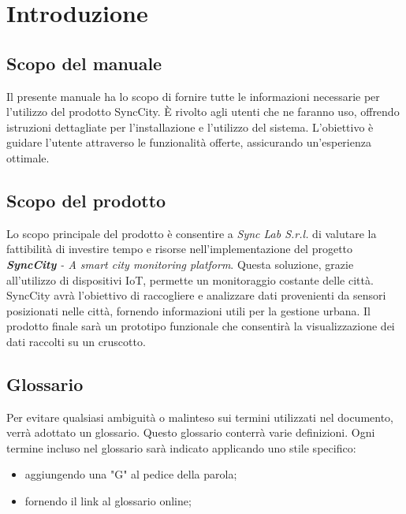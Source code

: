 \section{Introduzione}
\setcounter{subsection}{0}
\subsection{Scopo del manuale} %
Il presente manuale ha lo scopo di fornire tutte le informazioni necessarie per l’utilizzo del prodotto SyncCity. È rivolto agli utenti che ne faranno uso, offrendo istruzioni dettagliate per l’installazione e l’utilizzo del sistema. L’obiettivo è guidare l’utente attraverso le funzionalità offerte, assicurando un’esperienza ottimale.

\subsection{Scopo del prodotto}
Lo scopo principale del prodotto è consentire a \textit{Sync Lab S.r.l.} di valutare la fattibilità di investire tempo e risorse nell’implementazione del progetto \textit{\textbf{SyncCity} - A smart city monitoring platform}. Questa soluzione, grazie all’utilizzo di dispositivi IoT, permette un monitoraggio costante delle città. SyncCity avrà l’obiettivo di raccogliere e analizzare dati provenienti da sensori posizionati nelle città, fornendo informazioni utili per la gestione urbana. Il prodotto finale sarà un prototipo funzionale che consentirà la visualizzazione dei dati raccolti su un cruscotto.


\subsection{Glossario}
Per evitare qualsiasi ambiguità o malinteso sui termini utilizzati nel documento, verrà adottato un glossario. Questo glossario conterrà varie definizioni. Ogni termine incluso nel glossario sarà indicato applicando uno stile specifico:
\begin{itemize}
    \item aggiungendo una "G" al pedice della parola;
    \item fornendo il link al glossario online;
\end{itemize}

